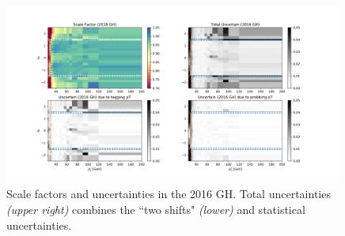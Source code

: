 \begin{figure}
    \centering
    \includegraphics[width=0.99\textwidth]{chapters/Analysis/sectionCalibration/figures/eTrigger/result_GH.png}
    \caption{Scale factors and uncertainties in the 2016 GH. Total uncertainties \emph{(upper right)} combines the ``two shifts" \emph{(lower)} and statistical uncertainties.}
    \label{fig:analysis:calibration:eTrSF_err_GH}
\end{figure}


